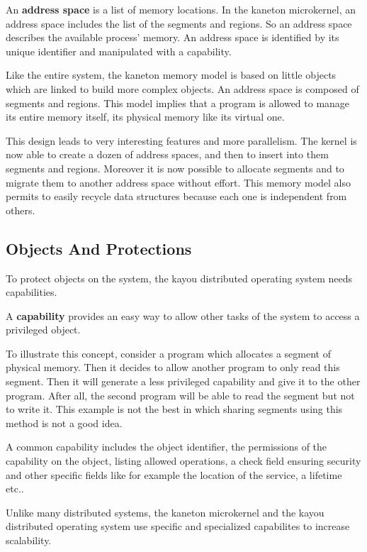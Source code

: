\begin{multicols}{2}
An \textbf{address space} is a list of memory locations. In the kaneton
microkernel, an address space includes the list of the segments and regions.
So an address space describes the available process' memory. An address space
is identified by its unique identifier and manipulated with a capability.

Like the entire system, the kaneton memory model is based on little objects
which are linked to build more complex objects. An address space is composed
of segments and regions. This model implies that a program is allowed to
manage its entire memory itself, its physical memory like its virtual one.

This design leads to very interesting features and more parallelism.
The kernel is now able to create a dozen of address spaces, and then to
insert into them segments and regions. Moreover it is now possible to allocate
segments and to migrate them to another address space without effort. This
memory model also permits to easily recycle data structures because each one
is independent from others.

%
%

\subsection{Objects And Protections}

To protect objects on the system, the kayou distributed operating system needs
capabilities.

A \textbf{capability} provides an easy way to allow other tasks of the
system to access a privileged object.

To illustrate this concept, consider a program which allocates a segment of
physical memory. Then it decides to allow another program to only read
this segment. Then it will generate a less privileged capability and give
it to the other program. After all, the second program will be able to read
the segment but not to write it. This example is not the best in which sharing
segments using this method is not a good idea.

A common capability includes the object identifier, the permissions of the
capability on the object, listing allowed operations, a check field ensuring
security and other specific fields like for example the location of the
service, a lifetime etc..

Unlike many distributed systems, the kaneton microkernel and the kayou
distributed operating system use specific and specialized capabilites to
increase scalability.


\end{multicols}
